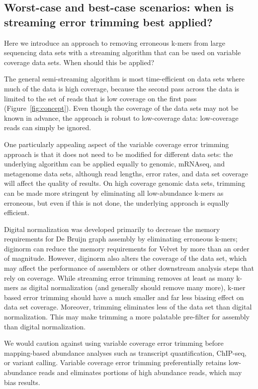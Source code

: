 \documentclass{article}
\begin{document}
\subsection{Worst-case and best-case scenarios: when is streaming error
trimming best applied?}

Here we introduce an approach to removing erroneous k-mers from large
sequencing data sets with a streaming algorithm that can be used
on variable coverage data sets.  When should this be applied?

The general semi-streaming algorithm is most time-efficient on data sets
where much of the data is high coverage, because the second pass
across the data is limited to the set of reads that is low coverage on
the first pass (Figure~\ref{fig:concept}).  Even though the coverage
of the data sets may not be known in advance, the approach is robust
to low-coverage data: low-coverage reads can simply be ignored.

One particularly appealing aspect of the variable coverage error
trimming approach is that it does not need to be modified for
different data sets: the underlying algorithm can be applied equally
to genomic, mRNAseq, and metagenome data sets, although read lengths,
error rates, and data set coverage will affect the quality of results.
On high coverage genomic data sets, trimming can be made more
stringent by eliminating all low-abundance k-mers as erroneous, but
even if this is not done, the underlying approach is equally
efficient.

Digital normalization was developed primarily to decrease the memory
requirements for De Bruijn graph assembly by eliminating erroneous
k-mers; diginorm can reduce the memory requirements for Velvet by more
than an order of magnitude.  However, diginorm also alters the
coverage of the data set, which may affect the performance of
assemblers or other downstream analysis steps that rely on coverage.
While streaming error trimming removes at least as many k-mers as
digital normalization (and generally should remove many more), k-mer
based error trimming should have a much smaller and far less biasing
effect on data set coverage.  Moreover, trimming eliminates
less of the data set than digital normalization.  This may make
trimming a more palatable pre-filter for assembly than digital
normalization.

We would caution against using variable coverage error trimming before
mapping-based abundance analyses such as transcript quantification,
ChIP-seq, or variant calling.  Variable coverage error trimming
preferentially retains low-abundance reads and eliminates portions of
high abundance reads, which may bias results.
\end{document}
